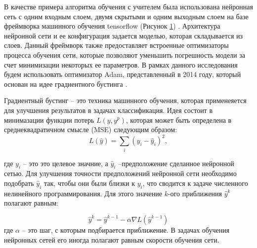 В качестве примера алгоритма обучения с учителем была использована нейронная сеть с одним входным слоем, двумя скрытыми и одним выходным слоем на базе фреймворка машинного обучения tensorflow (Рисунок \ref{fig:nn}) \cite{tensorflow}.
Архитектура нейронной сети и ее конфигурация задается моделью, которая складывается из слоев. 
Данный фреймворк также предоставляет встроенные оптимизаторы процесса обучения сети, которые позволяют уменьшить погрешность модели за счет минимизации некоторых ее параметров. В рамках данного исследования будем использовать оптимизатор Adam, представленный в 2014 году, который основан на идее градиентного бустинга \cite{adam}.

\begin{figure}[H]
	\caption{}
	\label{fig:nn}
\end{figure}

Градиентный бустинг -- это техника машинного обучения, которая применеяется для улучшения результатов в задачах классификация. Идея состоит в минимазации функции потерь $L(y, y^p)$, которая может быть определена в среднеквадратичном смысле (MSE) следующим образом:
\begin{equation}
	L(\hat y) = \sum_{i} (y_i - \hat y _i)^2,
\end{equation} 

где $y_i$ -- это это целевое значние, а $\hat y_i$ --предположение сделанное нейронной сетью.
Для улучшения точности предположений нейронной сети необходимо подобрать $\hat y_i$ так, чтобы они были близки к $y_i$, что сводится к задаче численного нелинейного программирования.
Для этого значение $k$-ого приближения $\hat y^k$ полагают равным:

\begin{equation}
	\hat y^k =\hat y^{k-1} - \alpha \nabla L(\hat y^{k-1})
\end{equation}
где $\alpha$ -- это шаг, с которым подбирается приближение. В задачах обучения нейронных сетей его иногда полагают равным скорости обучения сети.



